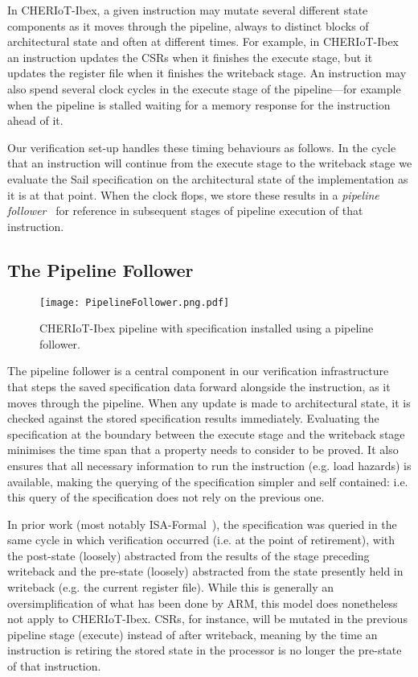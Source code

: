 \documentclass[10pt,conference]{IEEEtran}
\begin{document}
In CHERIoT-Ibex, a given instruction may mutate several different state
components as it moves through the pipeline, always to distinct blocks of
architectural state and often at different times.  For example, in
CHERIoT-Ibex an instruction updates the CSRs when it finishes the execute
stage, but it updates the register file when it finishes the writeback
stage. An instruction may also spend several clock cycles in the execute
stage of the pipeline---for example when the pipeline is stalled waiting for
a memory response for the instruction ahead of it.

Our verification set-up handles these timing behaviours as follows. In the
cycle that an instruction will continue from the execute stage to the
writeback stage we evaluate the Sail specification on the architectural state of
the implementation as it is at that point. When the clock flops,
we store these results in a \textit{pipeline follower}~\cite{Reid-2016-EEV}
for reference in subsequent stages of pipeline execution of that instruction.

\subsection{The Pipeline Follower}

\begin{figure*}[t]
  \begin{center}
    \texttt{[image: PipelineFollower.png.pdf]}
  \end{center}
  \caption{CHERIoT-Ibex pipeline with specification installed using a pipeline follower.}\label{follower.fig}
\end{figure*}

The pipeline follower is a central component in our verification
infrastructure that steps the saved specification data forward alongside
the instruction, as it moves through the pipeline. When any update is made
to architectural state, it is checked against the stored specification
results immediately. Evaluating the specification at the boundary
between the execute stage and the writeback stage minimises the time
span that a property needs to consider to be proved. It also ensures
that all necessary information to run the instruction (e.g. load hazards)
is available, making the querying of the specification simpler and self
contained: i.e. this query of the specification does not rely on
the previous one.

In prior work (most notably ISA-Formal~\cite{Reid-2016-EEV}), the specification was queried
in the same cycle in which verification occurred (i.e. at the point of retirement),
with the post-state (loosely) abstracted from the results of the
stage preceding writeback and the pre-state (loosely) abstracted from the state presently held in writeback (e.g. the
current register file). While this is generally an oversimplification of what has been done by ARM,
this model does nonetheless not apply to CHERIoT-Ibex. CSRs, for instance, will be mutated in the
previous pipeline stage (execute) instead of after writeback, meaning by the time an instruction is retiring the
stored state in the processor is no longer the pre-state of that instruction.
\end{document}
